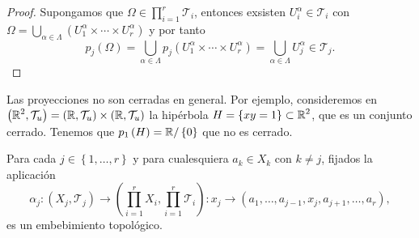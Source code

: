 \begin{proof}
	Supongamos que $\displaystyle \Omega \in \prod^{r}_{i = 1}\mathcal{T}_{i} $, entonces exsisten $\displaystyle U_{i}^{\alpha }\in \mathcal{T}_{i} $ con $\displaystyle \Omega = \bigcup_{\alpha \in \Lambda }\left(U_{1}^{\alpha } \times \cdots \times U_{r}^{\alpha }\right) $ y por tanto
	\[p_{j}\left(\Omega \right)=\bigcup_{\alpha \in \Lambda}p_{j}\left(U_{1}^{\alpha }\times \cdots \times U_{r}^{\alpha }\right) = \bigcup_{\alpha \in \Lambda }U_{j}^{\alpha} \in \mathcal{T}_{j} .\]
\end{proof}
\begin{observation}
Las proyecciones no son cerradas en general. Por ejemplo, consideremos en $\displaystyle \left(\mathbb{R}^{2}, \mathcal{T}_{u}\right)=\left(\mathbb{R}, \mathcal{T}_{u}\right) \times \left(\mathbb{R}, \mathcal{T}_{u}\right) $ la hipérbola $\displaystyle H = \left\{ xy = 1\right\} \subset \mathbb{R}^{2} $, que es un conjunto cerrado. Tenemos que $\displaystyle p_{1}\left(H\right)= \mathbb{R} / \left\{ 0\right\}  $ que no es cerrado.
\end{observation}

\begin{prop}
	Para cada $\displaystyle j \in \left\{ 1, \ldots, r\right\}  $ y para cualesquiera $\displaystyle a_{k}\in X_{k} $ con $\displaystyle k \neq j $, fijados la aplicación
	\[\alpha_{j} : \left(X_{j}, \mathcal{T}_{j}\right)\to \left(\prod^{r}_{i = 1}X_{i}, \prod^{r}_{i = 1}\mathcal{T}_{i}\right): x_{j}\to \left(a_{1}, \ldots, a_{j-1}, x_{j}, a_{j+1}, \ldots, a_{r}\right) ,\]
	es un embebimiento topológico.
\end{prop}

